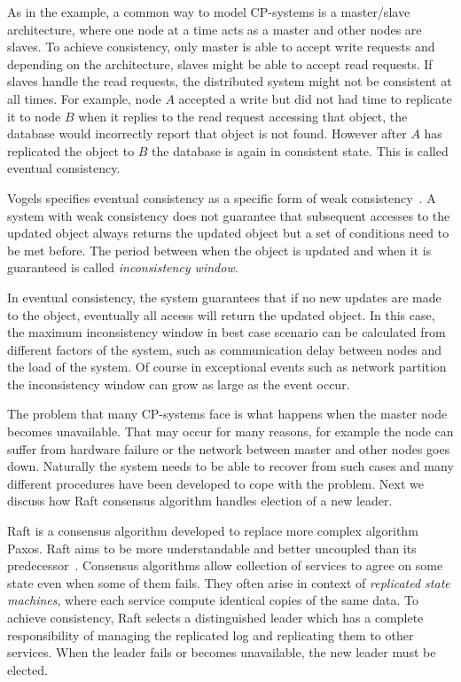 As in the example, a common way to model CP-systems is a master/slave
architecture, where one node at a time acts as a master and other nodes are
slaves. To achieve consistency, only master is able to accept write requests and
depending on the architecture, slaves might be able to accept read requests. If
slaves handle the read requests, the distributed system might not be consistent
at all times. For example, node \(A\) accepted a write but did not had time to
replicate it to node \(B\) when it replies to the read request accessing that
object, the database would incorrectly report that object is not found. However
after \(A\) has replicated the object to \(B\) the database is again in
consistent state. This is called eventual consistency.

Vogels specifies eventual consistency as a specific form of weak
consistency~\cite{vogels2009eventually}. A system with weak consistency does not
guarantee that subsequent accesses to the updated object always returns the
updated object but a set of conditions need to be met before. The period between
when the object is updated and when it is guaranteed is called
\emph{inconsistency window}.

In eventual consistency, the system guarantees that if no new updates are made
to the object, eventually all access will return the updated object. In this
case, the maximum inconsistency window in best case scenario can be calculated
from different factors of the system, such as communication delay between nodes
and the load of the system. Of course in exceptional events such as network
partition the inconsistency window can grow as large as the event occur.

The problem that many CP-systems face is what happens when the master node
becomes unavailable. That may occur for many reasons, for example the node can
suffer from hardware failure or the network between master and other nodes goes
down. Naturally the system needs to be able to recover from such cases and many
different procedures have been developed to cope with the problem. Next we
discuss how Raft consensus algorithm handles election of a new leader.

Raft is a consensus algorithm developed to replace more complex algorithm Paxos.
Raft aims to be more understandable and better uncoupled than its
predecessor~\cite{ongaro2014search}. Consensus algorithms allow collection of
services to agree on some state even when some of them fails. They often arise
in context of \emph{replicated state machines}, where each service compute
identical copies of the same data. To achieve consistency, Raft selects a
distinguished leader which has a complete responsibility of managing the
replicated log and replicating them to other services. When the leader fails or
becomes unavailable, the new leader must be elected.

